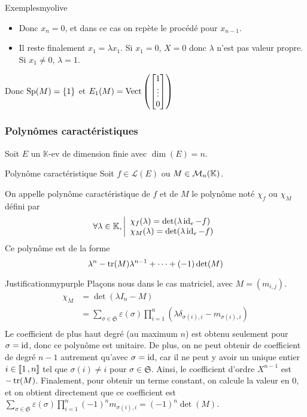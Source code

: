 \begin{omed}{Exemples}{myolive}
\begin{enumerate}[label=\arabic*.]
\begin{itemize}
                \item Donc $x_n = 0$, et dans ce cas on repète le procédé pour $x_{n-1}$. 
                \item Il reste finalement $x_1 = \lambda x_1$. Si $x_1 = 0$, $X = 0$ donc $\lambda$ n’est pas valeur propre. Si $x_1 \neq 0$, $\lambda = 1$.
            \end{itemize}
            Donc $\operatorname{Sp}(M) = \left\{1\right\}$ et $E_{1}(M) = \operatorname{Vect}\left(\begin{bmatrix}
                1 \\
                \vdots \\
                0
            \end{bmatrix}\right)$
        \end{enumerate}
    \end{omed}

    \subsubsection{Polynômes caractéristiques}

    Soit $E$ un $\mathbb{K}$-ev de dimension finie avec $\dim(E) = n$.

    \begin{defitheo}{Polynôme caractéristique}{}
        Soit $f \in \mathcal{L}(E)$ ou $M \in \mathcal{M}_{n}(\mathbb{K})$.

        On appelle polynôme caractéristique de $f$ et de $M$ le polynôme noté $\chi_f$ ou $\chi_M$ défini par 
        \[ \forall \lambda \in \mathbb{K}, \ou{\chi_f(\lambda) = \det(\lambda \id_e - f)}{\chi_M(\lambda) = \det(\lambda \id_e - f)} \]
        Ce polynôme est de la forme 
        \[ \lambda^n - \operatorname{tr}(M)\lambda^{n-1} + \cdots + (-1) \operatorname{det}(M) \] 
    \end{defitheo}

    \begin{demo}{Justification}{mypurple}
        Plaçons nous dans le cas matriciel, avec $M = (m_{i,j})$.
        \begin{align*}
            \chi_M
            &=\det(\lambda I_n - M) \\
            &= \sum_{\sigma \in \mathfrak{S}} \varepsilon(\sigma) \prod_{i=1}^n \left(\lambda \delta_{\sigma(i),i} - m_{\sigma(i),i}\right) \\
        \end{align*}
        Le coefficient de plus haut degré (au maximum $n$) est obtenu seulement pour $\sigma = \operatorname{id}$, donc ce polynôme est unitaire. De plus, on ne peut obtenir de coefficient de degré $n-1$ autrement qu’avec $\sigma = \operatorname{id}$, car il ne peut y avoir un unique entier $i \in \left\llbracket 1 \, , n \right\rrbracket$ tel que $\sigma(i) \neq i$ pour $\sigma \in \mathfrak{S}$. Ainsi, le coefficient d’ordre $X^{n-1}$ est $-\operatorname{tr}(M)$. Finalement, pour obtenir un terme constant, on calcule la valeur en $0$, et on obtient directement que ce coefficient est $\sum_{\sigma \in \mathfrak{S}} \varepsilon(\sigma) \prod_{i=1}^n (-1)^n m_{\sigma(i),i} = (-1)^n \det(M)$. 
    \end{demo}

